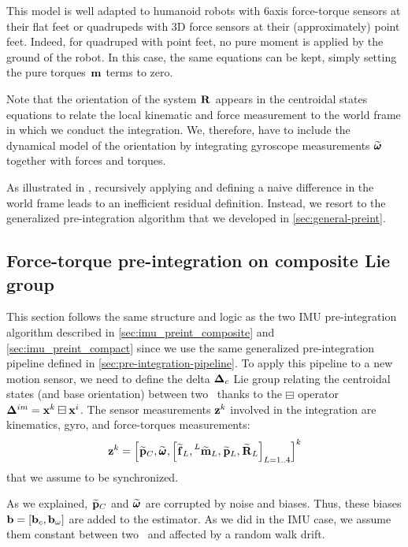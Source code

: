 This model is well adapted to humanoid robots with 6axis force-torque sensors at their flat feet or quadrupeds with 3D force sensors at their (approximately) 
point feet. Indeed, for quadruped with point feet, no pure moment is applied by the ground of the robot. In this case, the same equations can be kept, simply setting the
pure torques  $\prescript{}{}{\bf m}_{}$ terms to zero.

Note that the orientation of the system $\prescript{}{}{{\bf R}}_{}$ appears in the centroidal states equations to relate the local kinematic and force measurement to the world frame in
which we conduct the integration. We, therefore, have to include the dynamical model of the orientation by integrating gyroscope measurements $\prescript{}{}{\widetilde{\pmb{\omega}}}_{}$ together with forces and torques. 

As illustrated in , recursively applying  and defining a naive difference in the world frame leads to an inefficient
residual definition. Instead, we resort to the generalized pre-integration algorithm that we developed in \ref{sec:general-preint}.






\subsection{Force-torque pre-integration on composite Lie group}

This section follows the same structure and logic as the two IMU pre-integration algorithm described in \ref{sec:imu_preint_composite} and \ref{sec:imu_preint_compact} since
we use the same generalized pre-integration pipeline defined in \ref{sec:pre-integration-pipeline}. 
To apply this pipeline to a new motion sensor, we need to define the delta ${{\bm \Delta}}_c$ Lie group relating the centroidal states (and base orientation) between two \keyframes\ thanks to the $\boxminus$ operator 
${{\bm \Delta}}^{im}={\bf x}^k\boxminus{\bf x}^i$. The sensor measurements ${\bf z}^k$ involved in the integration are kinematics, gyro, and force-torques  measurements:
%
\begin{equation}
    {\bf z}^k = \left[ \prescript{}{}{\widetilde{{\bf p}}}_{C}, \prescript{}{}{\widetilde{\pmb{\omega}}}_{}, \left[\prescript{}{}{\widetilde{{\bf f}}}_{L}, \prescript{L}{}{\widetilde{\bf m}}_{L}, \prescript{}{}{\widetilde{{\bf p}}}_{L}, \prescript{}{}{\widetilde{{\bf R}}}_{L} \right]_{L=1..4}\right]^k
\end{equation}
%
that we assume to be synchronized.

As we explained, $\prescript{}{}{\widetilde{{\bf p}}}_{C}$ and $\prescript{}{}{\widetilde{\pmb{\omega}}}_{}$ are corrupted by noise and biases. Thus, these biases  ${\bf b} = [{\bf b}_c, {\bf b}_{\omega}]$ are added to the estimator.
As we did in the IMU case, we assume them constant between two \keyframes\ and affected by a random walk drift.


